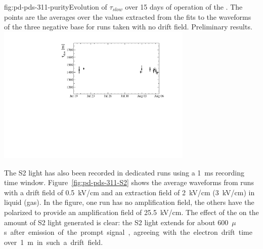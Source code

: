 \begin{dunefigure}{fig:pd-pds-311-purity}{Evolution of $\tau_{slow}$ over \num{15} days of operation of the . The points are the averages over the values extracted from the fits to the waveforms of the three negative base  for runs taken with no drift field. Preliminary results.}
\includegraphics[width=0.7\textwidth]{graphics/dppd_311_purity.pdf}
\end{dunefigure}

The S2 light has also been recorded in dedicated runs using a \SI{1}{ms} recording time window.
Figure~\ref{fig:pd-pds-311-S2} shows the average waveforms from runs with a drift field of \SI{0.5}{kV/cm} and an extraction field of \SI{2}{kV/cm} (\SI{3}{kV/cm}) in liquid (gas). In the figure, one run has no amplification field, the others have the  polarized to provide an amplification field of \SI{25.5}{kV/cm}. 
The effect of the  on the amount of S2 light generated is clear: 
the S2 light extends for about \SI{600}{$\mu$s} after emission of the prompt signal, agreeing with the electron drift time over \SI{1}{m} in such a drift field.

